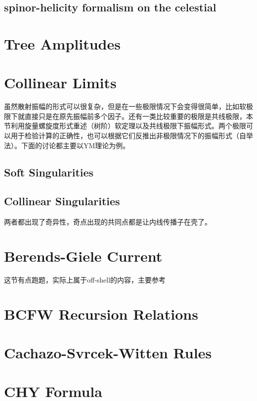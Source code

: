 \subsection{spinor-helicity formalism on the celestial}
\cite{Pasterski:2017ylz}
\section{Tree Amplitudes}


\section{Collinear Limits} 
虽然散射振幅的形式可以很复杂，但是在一些极限情况下会变得很简单，比如软极限下就直接只是在原先振幅前多个因子。还有一类比较重要的极限是共线极限，本节利用旋量螺旋度形式重述（树阶）软定理以及共线极限下振幅形式。两个极限可以用于检验计算的正确性，也可以根据它们反推出非极限情况下的振幅形式（自举法）。下面的讨论都主要以YM理论为例。

\subsection{Soft Singularities}

\subsection{Collinear Singularities}


两者都出现了奇异性，奇点出现的共同点都是让内线传播子在壳了。
\section{Berends-Giele Current}
这节有点跑题，实际上属于off-shell的内容，主要参考\cite{Dixon:1996wi,Mangano:1990by}
\section{BCFW Recursion Relations}
\section{Cachazo-Svrcek-Witten Rules}
\section{CHY Formula}